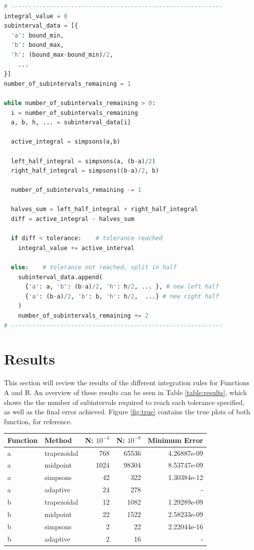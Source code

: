 \documentclass{article}
\begin{document}
\bigskip
\small
\begin{lstlisting}[language=Python]
# ------------------------------------------------------------
integral_value = 0
subinterval_data = [{
  'a': bound_min, 
  'b': bound_max, 
  'h': (bound_max-bound_min)/2, 
    ...
}]
number_of_subintervals_remaining = 1

while number_of_subintervals_remaining > 0:
  i = number_of_subintervals_remaining
  a, b, h, ... = subinterval_data[i]

  active_integral = simpsons(a,b)

  left_half_integral = simpsons(a, (b-a)/2)
  right_half_integral = simpsons((b-a)/2, b)
	
  number_of_subintervals_remaining -= 1
  
  halves_sum = left_half_integral + right_half_integral
  diff = active_integral - halves_sum 
  	
  if diff < tolerance:    # tolerance reached
    integral_value += active_interval
		
  else:    # tolerance not reached, split in half
    subinterval_data.append(
      {'a': a, 'b': (b-a)/2, 'h': h/2, ... }, # new left half
      {'a': (b-a)/2, 'b': b, 'h': h/2,  ...} # new right half
    )
    number_of_subintervals_remaining += 2
# ------------------------------------------------------------
\end{lstlisting}
\bigskip
\normalsize


\newpage
\section{Results}
\label{sec:results}

This section will review the results of the different integration rules for Functions A and B. An overview of these results can be seen in Table \ref{table:results}, which shows the the number of subintervals required to reach each tolerance specified, as well as the final error achieved. Figure \ref{fig:true} contains the true plots of both function, for reference.

\bgroup
\footnotesize
\def\arraystretch{1.5}
\begin{center}
	\centering
	\begin{tabular}{l|l|r|r|r}
	\textbf{Function} & \textbf{Method} & \textbf{N: $10^{-4}$} & \textbf{N: $10^{-8}$} &\textbf{Minimum Error} \\
	\hline  
	a & trapezoidal & 768  & 65536 & 4.26887e-09 \\
    a & midpoint    & 1024 & 98304 & 8.53747e-09 \\
    a & simpsons    & 42   & 322   & 1.30384e-12 \\
    a & adaptive    & 24   & 278   & -           \\
    b & trapezoidal & 12   & 1082  & 1.29289e-09 \\
    b & midpoint    & 22   & 1522  & 2.58233e-09 \\
    b & simpsons    & 2    & 22    & 2.22044e-16 \\
    b & adaptive    & 2    & 16    & -  
	\end{tabular}
	\label{table:results}
\end{center}
\egroup
\end{document}
